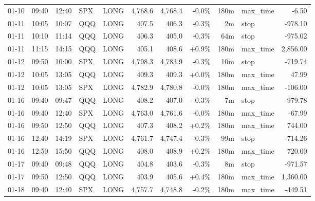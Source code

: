 \documentclass[11pt,a4paper,twoside]{article}
\begin{document}
\begin{center}
\begin{longtable}{>{\color{txtmain}}l l l l l r r r r >{\color{txtmain}}l r}
01-10 & 09:40 & 12:40 & SPX & LONG & 4,768.6 & 4,768.4 & \textcolor{lossred}{-0.0\%} & 180m & max\_time & \textcolor{lossred}{-6.50} \\
01-11 & 10:05 & 10:07 & QQQ & LONG & 407.5 & 406.3 & \textcolor{lossred}{-0.3\%} & 2m & stop & \textcolor{lossred}{-978.10} \\
01-11 & 10:10 & 11:14 & QQQ & LONG & 406.3 & 405.0 & \textcolor{lossred}{-0.3\%} & 64m & stop & \textcolor{lossred}{-975.02} \\
01-11 & 11:15 & 14:15 & QQQ & LONG & 405.1 & 408.6 & \textcolor{wingreen}{+0.9\%} & 180m & max\_time & \textcolor{wingreen}{2,856.00} \\
01-12 & 09:50 & 10:00 & SPX & LONG & 4,798.3 & 4,783.9 & \textcolor{lossred}{-0.3\%} & 10m & stop & \textcolor{lossred}{-719.74} \\
01-12 & 10:05 & 13:05 & QQQ & LONG & 409.3 & 409.3 & \textcolor{wingreen}{+0.0\%} & 180m & max\_time & \textcolor{wingreen}{47.99} \\
01-12 & 10:05 & 13:05 & SPX & LONG & 4,782.9 & 4,780.8 & \textcolor{lossred}{-0.0\%} & 180m & max\_time & \textcolor{lossred}{-106.00} \\
01-16 & 09:40 & 09:47 & QQQ & LONG & 408.2 & 407.0 & \textcolor{lossred}{-0.3\%} & 7m & stop & \textcolor{lossred}{-979.78} \\
01-16 & 09:40 & 12:40 & SPX & LONG & 4,763.0 & 4,761.6 & \textcolor{lossred}{-0.0\%} & 180m & max\_time & \textcolor{lossred}{-67.99} \\
01-16 & 09:50 & 12:50 & QQQ & LONG & 407.3 & 408.2 & \textcolor{wingreen}{+0.2\%} & 180m & max\_time & \textcolor{wingreen}{744.00} \\
01-16 & 12:40 & 14:19 & SPX & LONG & 4,761.7 & 4,747.4 & \textcolor{lossred}{-0.3\%} & 99m & stop & \textcolor{lossred}{-714.26} \\
01-16 & 12:50 & 15:50 & QQQ & LONG & 408.0 & 408.9 & \textcolor{wingreen}{+0.2\%} & 180m & max\_time & \textcolor{wingreen}{720.00} \\
01-17 & 09:40 & 09:48 & QQQ & LONG & 404.8 & 403.6 & \textcolor{lossred}{-0.3\%} & 8m & stop & \textcolor{lossred}{-971.57} \\
01-17 & 09:50 & 12:50 & QQQ & LONG & 403.9 & 405.6 & \textcolor{wingreen}{+0.4\%} & 180m & max\_time & \textcolor{wingreen}{1,360.00} \\
01-18 & 09:40 & 12:40 & SPX & LONG & 4,757.7 & 4,748.8 & \textcolor{lossred}{-0.2\%} & 180m & max\_time & \textcolor{lossred}{-449.51} \\

\end{longtable}
\end{center}
\end{document}
